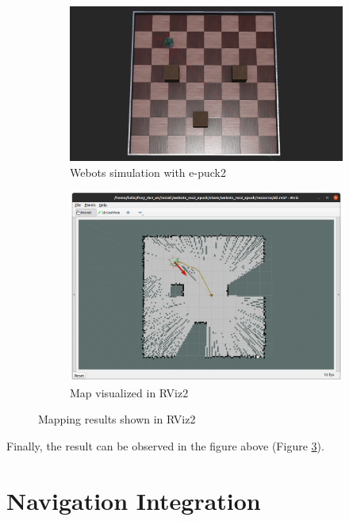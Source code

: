 \begin{figure}[H]
\centering
\begin{subfigure}{.95\textwidth}
  \centering
  \includegraphics[width=\linewidth]{demos/figures/map_webots.png}
  \caption{Webots simulation with e-puck2}
  \label{fig:demos:mapping:map_webots}
\end{subfigure}
\begin{subfigure}{.95\textwidth}
  \centering
  \includegraphics[width=\linewidth]{demos/figures/map_rviz.png}
  \caption{Map visualized in RViz2}
  \label{fig:demos:mapping:map_rviz}
\end{subfigure}
\caption{Mapping results shown in RViz2}
\label{fig:demos:mapping}
\end{figure}

Finally, the result can be observed in the figure above (Figure \ref{fig:demos:mapping}).

\section{Navigation Integration}
\label{sec:demos:navigation}

